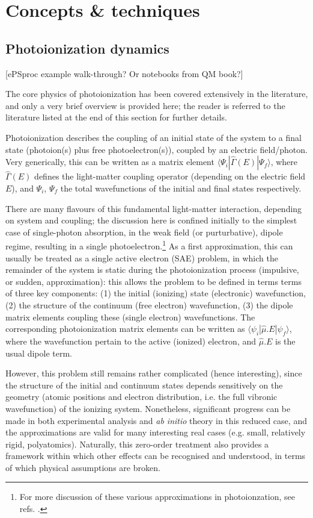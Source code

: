 \section{Concepts \& techniques}

\subsection{Photoionization dynamics} 
[ePSproc example walk-through? Or notebooks from QM book?]

The core physics of photoionization has been covered extensively in the literature, and only a very brief overview is provided here; the reader is referred to the literature listed at the end of this section for further details.

Photoionization describes the coupling of an initial state of the system to a final state (photoion(s) plus free photoelectron(s)), coupled by an electric field/photon. Very generically, this can be written as a matrix element $\langle\Psi_i|\hat{\Gamma}(E)|\Psi_f\rangle$, where $\hat{\Gamma}(E)$ defines the light-matter coupling operator (depending on the electric field $E$), and $\Psi_i$, $\Psi_f$ the total wavefunctions of the initial and final states respectively. 

There are many flavours of this fundamental light-matter interaction, depending on system and coupling; the discussion here is confined initially to the simplest case of single-photon absorption, in the weak field (or purturbative), dipole regime, resulting in a single photoelectron.\footnote{For more discussion of these various approximations in photoionzation, see refs. \cite{Seideman2002,Seideman2001}.} As a first approximation, this can usually be treated as a single active electron (SAE) problem, in which the remainder of the system is static during the photoionization process (impulsive, or sudden, approximation): this allows the problem to be defined in terms terms of three key components: (1) the initial (ionizing) state (electronic) wavefunction, (2) the structure of the continuum (free electron) wavefunction, (3) the dipole matrix elements coupling these (single electron) wavefunctions. The corresponding photoionization matrix elements can be written as $\langle\psi_i|\hat{\mu}.E|\psi_f\rangle$, where the wavefunction pertain to the active (ionized) electron, and $\hat{\mu}.E$ is the usual dipole term.

However, this problem still remains rather complicated (hence interesting), since the structure of the initial and continuum states depends sensitively on the geometry (atomic positions and electron distribution, i.e. the full vibronic wavefunction) of the ionizing system. Nonetheless, significant progress can be made in both experimental analysis and \textit{ab initio} theory in this reduced case, and the approximations are valid for many interesting real cases (e.g. small, relatively rigid, polyatomics). Naturally, this zero-order treatment also provides a framework within which other effects can be recognised and understood, in terms of which physical assumptions are broken.

